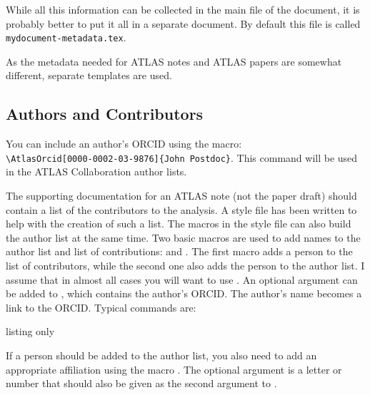 While all this information can be collected in the main file of the document, 
it is probably better to put it all in a separate document.
By default this file is called \texttt{mydocument-metadata.tex}.

 As the metadata needed for ATLAS notes and ATLAS papers are somewhat different,
separate templates are used.


\subsection{Authors and Contributors}
\label{sec:contribute}

You can include an author's ORCID using the  macro:\\
\verb+\AtlasOrcid[0000-0002-03-9876]{John Postdoc}+.
This command will be used in the ATLAS Collaboration author lists.

The supporting documentation for an ATLAS note (not the paper draft) should contain a list of the contributors to the analysis.
A style file  has been written to help with the creation of such a list.
The macros in the style file can also build the author list at the same time.
Two basic macros are used to add names to the author list and list of contributions:
 and . 
The first macro adds a person to the list of contributors, while the second one also adds the person
to the author list. I assume that in almost all cases you will want to use .
An optional argument can be added to , which contains the author's ORCID.
The author's name becomes a link to the ORCID.
Typical commands are:
\begin{tcblisting}{listing only}
\end{tcblisting}
If a person should be added to the author list, you also need to add an appropriate affiliation using the macro .
The optional argument is a letter or number that should also be given as the second argument to
.

